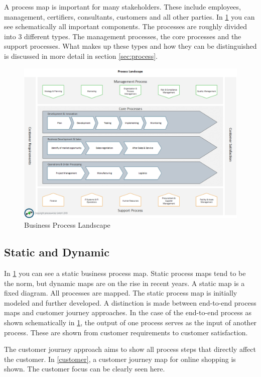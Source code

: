 \documentclass[11pt,a4paper]{article}
\begin{document}
A process map is important for many stakeholders. These include employees,
management, certifiers, consultants, customers and all other parties. In
\ref{BPL} you can see schematically all important components. The processes
are roughly divided into 3 different types. The management processes, the core
processes and the support processes. What makes up these types and how they
can be distinguished is discussed in more detail in section \ref{sec:process}.

\begin{figure}[h] 
  \centering
     \includegraphics[width=1\textwidth]{plk.en.png}
  \caption{Business Process Landscape \cite{7}}
  \label{BPL} 
\end{figure}

\subsection{Static and Dynamic}

In \ref{BPL} you can see a static business process map. Static process maps
tend to be the norm, but dynamic maps are on the rise in recent years. A
static map is a fixed diagram. All processes are mapped. The static process
map is initially modeled and further developed. A distinction is made between
end-to-end process maps and customer journey approaches. In the case of the
end-to-end process as shown schematically in \ref{BPL}, the output of one
process serves as the input of another process. These are shown from customer
requirements to customer satisfaction.

The customer journey approach aims to show all process steps that directly
affect the customer. In \ref{customer}, a customer journey map for online
shopping is shown. The customer focus can be clearly seen here.
\end{document}
